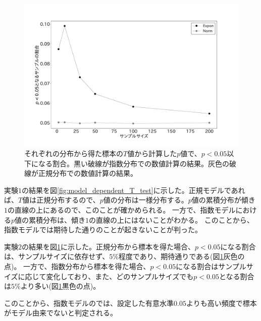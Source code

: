 \begin{figure}
 \begin{center}
  \includegraphics[width=15cm]{./image/04_/t_test_expon_norm.pdf}
  \caption{それぞれの分布から得た標本の$T$値から計算した$p$値で、$p<0.05$以下になる割合。黒い破線が指数分布での数値計算の結果。灰色の破線が正規分布での数値計算の結果。}
  \label{fig:t_test_expon_norm}
 \end{center}
\end{figure}

実験$1$の結果を図\ref{fig:model_dependent_T_test}に示した。正規モデルであれば、$T$値は正規分布するので、$p$値の分布は一様分布する。$p$値の累積分布が傾き$1$の直線の上にあるので、このことが確かめられる。
一方で、指数モデルにおける$p$値の累積分布は、傾き$1$の直線の上にはないことがわかる。
このことから、指数モデルでは期待した通りのことが起きないことが判った。

実験$2$の結果を図\ref{fig:t_test_expon_norm}に示した。正規分布から標本を得た場合、$p<0.05$になる割合は、サンプルサイズに依存せず、$5\%$程度であり、期待通りである(図\ref{fig:t_test_expon_norm}灰色の点)。
一方で、指数分布から標本を得た場合、$p<0.05$になる割合はサンプルサイズに応じて変化しており、また、どのサンプルサイズでも$p<0.05$となる割合は$5\%$より多い(図\ref{fig:t_test_expon_norm}黒色の点)。

このことから、指数モデルのでは、設定した有意水準$0.05$よりも高い頻度で標本がモデル由来でないと判定される。

